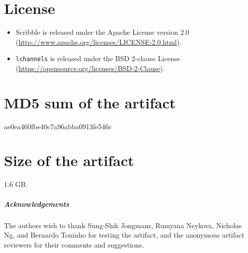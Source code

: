 \documentclass[a4paper,UKenglish]{darts}
\newcommand{\license}[1]{{\section{License}#1}}
\newcommand{\mdsum}[1]{{\section{MD5 sum of the artifact}#1}}
\newcommand{\artifactsize}[1]{{\section{Size of the artifact}#1}}
\begin{document}
\license{%
  \begin{itemize}%
  \item%
    Scribble is released under the Apache License version 2.0 %
    (\url{http://www.apache.org/licenses/LICENSE-2.0.html}).%
  \item%
    \texttt{lchannels} is released under %
    the BSD 2-clause License %
    (\url{https://opensource.org/licenses/BSD-2-Clause}).
  \end{itemize}
}%

\mdsum{ae0ea460fbe40c7a96abba0913fe546c}

\artifactsize{1.6 GB.}

\subparagraph*{Acknowledgements}

The authors wish to thank %
Sung-Shik Jongmans, %
Rumyana Neykova, %
Nicholas Ng, %
and Bernardo Toninho %
for testing the artifact, %
and the anonymous artifact reviewers for their comments and suggestions.

%
\end{document}
